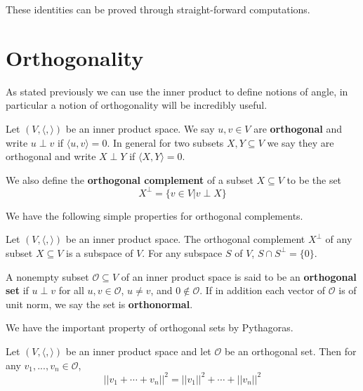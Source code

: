 These identities can be proved through straight-forward computations. 

\section{Orthogonality}\label{sec:orthogonality}


As stated previously we can use the inner product to define notions of angle, in particular a notion of orthogonality will be incredibly useful.

\begin{definition}
    Let $(V,\langle,\rangle)$ be an inner product space. We say $u,v \in V$ are \textbf{orthogonal} and write $u\perp v$ if $\langle u,v\rangle = 0$. In general for two subsets $X,Y\subseteq V$ we say they are orthogonal and write $X\perp Y$ if $\langle X,Y\rangle = 0$.

    We also define the \textbf{orthogonal complement} of a subset $X\subseteq V$ to be the set \begin{equation*}
        X^{\perp} = \{v \in V|v\perp X\}
    \end{equation*}
\end{definition}

We have the following simple properties for orthogonal complements.

\begin{theorem}
    Let $(V,\langle,\rangle)$ be an inner product space. The orthogonal complement $X^{\perp}$ of any subset $X \subseteq V$ is a subspace of $V$. For any subspace $S$ of $V$, $S \cap S^{\perp} = \{0\}$.
\end{theorem}

\begin{definition}
    A nonempty subset $\mathcal{O} \subseteq V$ of an inner product space is said to be an \textbf{orthogonal set} if $u\perp v$ for all $u,v \in \mathcal{O}$, $u\neq v$, and $0 \notin \mathcal{O}$. If in addition each vector of $\mathcal{O}$ is of unit norm, we say the set is \textbf{orthonormal}.
\end{definition}

We have the important property of orthogonal sets by Pythagoras.

\begin{theorem}
    Let $(V,\langle,\rangle)$ be an inner product space and let $\mathcal{O}$ be an orthogonal set. Then for any $v_1,...,v_n \in \mathcal{O}$, \begin{equation*}
        ||v_1+\cdots +v_n||^2 = ||v_1||^2+\cdots +||v_n||^2
    \end{equation*}
\end{theorem}

